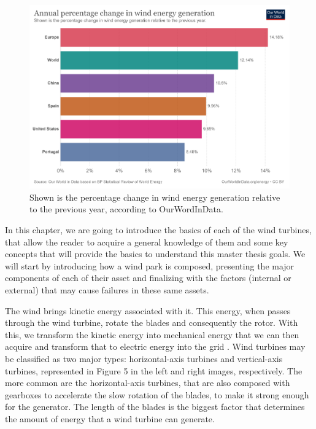 \begin{figure}[htbp]
	\centering
	\includegraphics[width=\textwidth]{Chapters/Figures/background_fig4.PNG}
	\caption{Shown is the percentage change in wind energy generation relative to the previous year, according to OurWordInData. \cite{OLD_33_GENERAL} }
	\label{fig:Figuras_Tree_silhouettes-vectorial}
\end{figure}


In this chapter, we are going to introduce the basics of each of the wind turbines, that allow the reader to acquire a general knowledge of them and some key concepts that will provide the basics to understand this master thesis goals. We will start by introducing how a wind park is composed, presenting the major components of each of their asset and finalizing with the factors (internal or external) that may cause failures in these same assets.


The wind brings kinetic energy associated with it. This energy, when passes through the wind turbine, rotate the blades and consequently the rotor. With this, we transform the kinetic energy into mechanical energy that we can then acquire and transform that to electric energy into the grid \cite{OLD_29_WIND} \cite{OLD_31}.
Wind turbines may be classified as two major types: horizontal-axis turbines and vertical-axis turbines, represented in Figure 5 in the left and right images, respectively. The more common are the horizontal-axis turbines, that are also composed with gearboxes to accelerate the slow rotation of the blades, to make it strong enough for the generator. The length of the blades is the biggest factor that determines the amount of energy that a wind turbine can generate.

